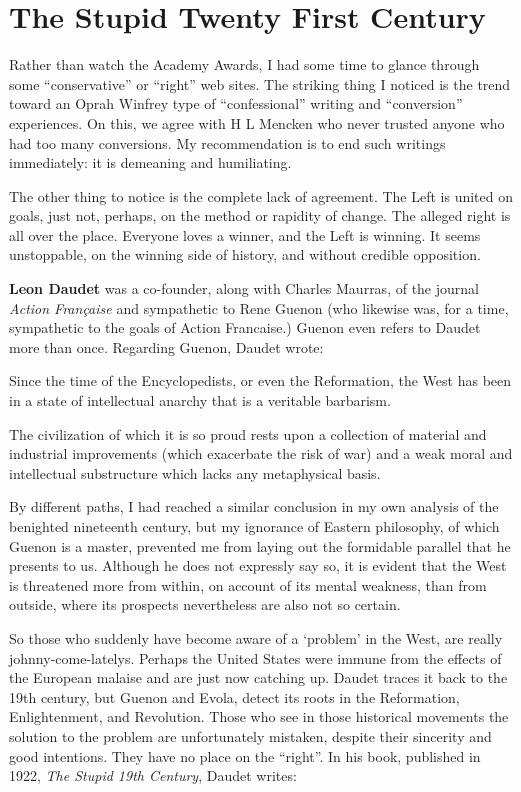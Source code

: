 \section{The Stupid Twenty First Century}

Rather than watch the Academy Awards, I had some time to glance through some ``conservative'' or ``right'' web sites. The striking thing I noticed is the trend toward an Oprah Winfrey type of ``confessional'' writing and ``conversion'' experiences. On this, we agree with H L Mencken who never trusted anyone who had too many conversions. My recommendation is to end such writings immediately: it is demeaning and humiliating.

The other thing to notice is the complete lack of agreement. The Left is united on goals, just not, perhaps, on the method or rapidity of change. The alleged right is all over the place. Everyone loves a winner, and the Left is winning. It seems unstoppable, on the winning side of history, and without credible opposition.

\textbf{Leon Daudet} was a co-founder, along with Charles Maurras, of the journal \emph{Action Française} and sympathetic to Rene Guenon (who likewise was, for a time, sympathetic to the goals of Action Francaise.) Guenon even refers to Daudet more than once. Regarding Guenon, Daudet wrote:

\begin{quotex}
Since the time of the Encyclopedists, or even the Reformation, the West has been in a state of intellectual anarchy that is a veritable barbarism.

The civilization of which it is so proud rests upon a collection of material and industrial improvements (which exacerbate the risk of war) and a weak moral and intellectual substructure which lacks any metaphysical basis.

By different paths, I had reached a similar conclusion in my own analysis of the benighted nineteenth century, but my ignorance of Eastern philosophy, of which Guenon is a master, prevented me from laying out the formidable parallel that he presents to us. Although he does not expressly say so, it is evident that the West is threatened more from within, on account of its mental weakness, than from outside, where its prospects nevertheless are also not so certain.
\end{quotex}


So those who suddenly have become aware of a `problem' in the West, are really johnny-come-latelys. Perhaps the United States were immune from the effects of the European malaise and are just now catching up. Daudet traces it back to the 19th century, but Guenon and Evola, detect its roots in the Reformation, Enlightenment, and Revolution. Those who see in those historical movements the solution to the problem are unfortunately mistaken, despite their sincerity and good intentions. They have no place on the ``right''. In his book, published in 1922, \emph{The Stupid 19th Century}, Daudet writes:


